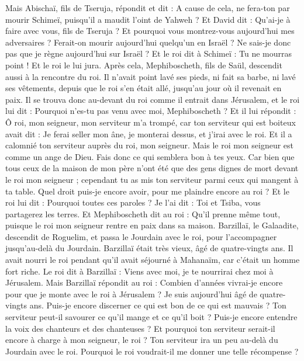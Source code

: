 \begin{multicols}{2}
Mais Abischaï, fils de Tseruja, répondit et dit : A cause de cela, ne fera-ton par mourir Schimeï, puisqu’il a maudit l'oint de Yahweh ?
Et David dit : Qu'ai-je à faire avec vous, fils de Tseruja ? Et pourquoi vous montrez-vous aujourd'hui mes adversaires ? Ferait-on mourir aujourd'hui quelqu'un en Israël ? Ne sais-je donc pas que je règne aujourd'hui sur Israël ?
Et le roi dit à Schimeï : Tu ne mourras point ! Et le roi le lui jura.
Après cela, Mephiboscheth, fils de Saül, descendit aussi à la rencontre du roi. Il n'avait point lavé ses pieds, ni fait sa barbe, ni lavé ses vêtements, depuis que le roi s'en était allé, jusqu'au jour où il revenait en paix.
Il se trouva donc au-devant du roi comme il entrait dans Jérusalem, et le roi lui dit : Pourquoi n'es-tu pas venu avec moi, Mephiboscheth ?
Et il lui répondit : Ô roi, mon seigneur, mon serviteur m'a trompé, car ton serviteur qui est boiteux avait dit : Je ferai seller mon âne, je monterai dessus, et j'irai avec le roi.
Et il a calomnié ton serviteur auprès du roi, mon seigneur. Mais le roi mon seigneur est comme un ange de Dieu. Fais donc ce qui semblera bon à tes yeux.
Car bien que tous ceux de la maison de mon père n’ont été que des gens dignes de mort devant le roi mon seigneur ; cependant tu as mis ton serviteur parmi ceux qui mangent à ta table. Quel droit puis-je encore avoir, pour me plaindre encore au roi ?
Et le roi lui dit : Pourquoi toutes ces paroles ? Je l'ai dit : Toi et Tsiba, vous partagerez les terres.
Et Mephiboscheth dit au roi : Qu'il prenne même tout, puisque le roi mon seigneur rentre en paix dans sa maison.
Barzillaï, le Galaadite, descendit de Roguelim, et passa le Jourdain avec le roi, pour l'accompagner jusqu'au-delà du Jourdain.
Barzillaï était très vieux, âgé de quatre-vingts ans. Il avait nourri le roi pendant qu'il avait séjourné à Mahanaïm, car c'était un homme fort riche.
Le roi dit à Barzillaï : Viens avec moi, je te nourrirai chez moi à Jérusalem.
Mais Barzillaï répondit au roi : Combien d'années vivrai-je encore pour que je monte avec le roi à Jérusalem ?
Je suis aujourd'hui âgé de quatre-vingts ans. Puis-je encore discerner ce qui est bon de ce qui est mauvais ? Ton serviteur peut-il savourer ce qu'il mange et ce qu'il boit ? Puis-je encore entendre la voix des chanteurs et des chanteuses ? Et pourquoi ton serviteur serait-il encore à charge à mon seigneur, le roi ?
Ton serviteur ira un peu au-delà du Jourdain avec le roi. Pourquoi le roi voudrait-il me donner une telle récompense ?

\end{multicols}
